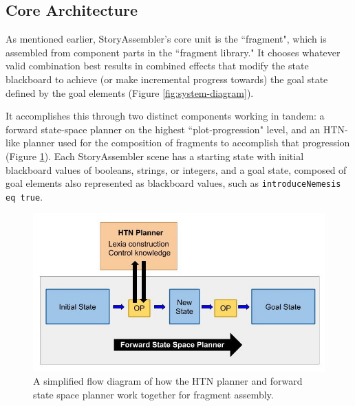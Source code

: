 \subsection{Core Architecture}
\label{core-architecture}

As mentioned earlier, StoryAssembler's core unit is the ``fragment", which is assembled from component parts in the ``fragment library." It chooses whatever valid combination best results in combined effects that modify the state blackboard to achieve (or make incremental progress towards) the goal state defined by the goal elements (Figure \ref{fig:system-diagram}).

It accomplishes this through two distinct components working in tandem: a forward state-space planner \cite{forwardPlanner} on the highest ``plot-progression" level, and an HTN-like planner  \cite{htn} used for the composition of fragments to accomplish that progression (Figure \ref{fig:htn}). Each StoryAssembler scene has a starting state with initial blackboard values of booleans, strings, or integers, and a goal state, composed of goal elements also represented as blackboard values, such as \texttt{introduceNemesis eq true}.


\begin{figure}
    \centering
    \includegraphics[width=\textwidth]{figures/3-StoryAssembler/htn-diagram.jpg}
    \caption{A simplified flow diagram of how the HTN planner and forward state space planner work together for fragment assembly.}
    \label{fig:htn}
\end{figure}


